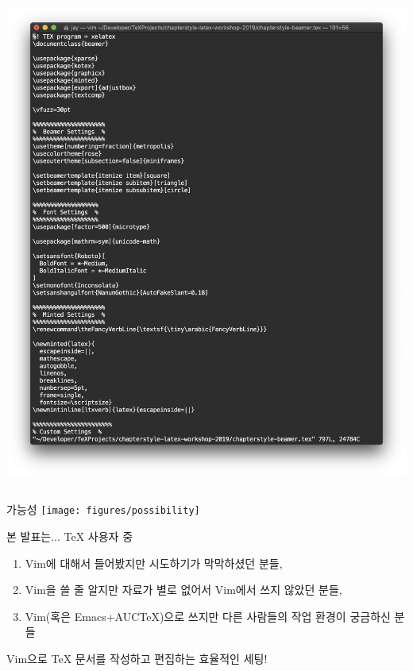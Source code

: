 \documentclass{beamer}
\begin{document}
\begin{frame}[plain]{}
\begin{columns}
\begin{column}{0.5\linewidth}
      \includegraphics[width=\linewidth]{figures/vanilla-vim}
    \end{column}
  \end{columns}
\end{frame}

\begin{frame}[plain]{가능성}
  \centering\texttt{[image: figures/possibility]}
\end{frame}

\begin{frame}{본 발표는...}
  \TeX{} 사용자 중
  \begin{enumerate}
    \item Vim에 대해서 들어봤지만 시도하기가 막막하셨던 분들,\pause
    \item Vim을 쓸 줄 알지만 자료가 별로 없어서  Vim에서 쓰지 않았던
      분들,\pause
    \item Vim(혹은 Emacs+AUC\TeX)으로  쓰지만 다른 사람들의 작업 환경이
      궁금하신 분들\pause
  \end{enumerate}
  \vpad
  \centering\alert{Vim으로 \TeX{} 문서를 작성하고 편집하는 효율적인 세팅!}
\end{frame}
\end{document}
